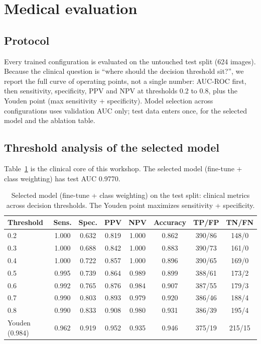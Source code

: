 \documentclass[11pt,a4paper]{article}
\begin{document}
\section{Medical evaluation}

\subsection{Protocol}

Every trained configuration is evaluated on the untouched test split (624 images). Because the clinical question is ``where should the decision threshold sit?'', we report the full curve of operating points, not a single number: AUC-ROC first, then sensitivity, specificity, PPV and NPV at thresholds 0.2 to 0.8, plus the Youden point (max sensitivity + specificity). Model selection across configurations uses validation AUC only; test data enters once, for the selected model and the ablation table.

\subsection{Threshold analysis of the selected model}

Table~\ref{tab:thresholds} is the clinical core of this workshop. The selected model (fine-tune + class weighting) has test AUC 0.9770.

\begin{table}[h]
\centering
\caption{Selected model (fine-tune + class weighting) on the test split: clinical metrics across decision thresholds. The Youden point maximizes sensitivity + specificity.}
\label{tab:thresholds}
\small
\setlength{\tabcolsep}{4.5pt}
\begin{tabular}{lccccccc}
\toprule
Threshold & Sens. & Spec. & PPV & NPV & Accuracy & TP/FP & TN/FN \\
\midrule
0.2 & 1.000 & 0.632 & 0.819 & 1.000 & 0.862 & 390/86 & 148/0 \\
0.3 & 1.000 & 0.688 & 0.842 & 1.000 & 0.883 & 390/73 & 161/0 \\
0.4 & 1.000 & 0.722 & 0.857 & 1.000 & 0.896 & 390/65 & 169/0 \\
0.5 & 0.995 & 0.739 & 0.864 & 0.989 & 0.899 & 388/61 & 173/2 \\
0.6 & 0.992 & 0.765 & 0.876 & 0.984 & 0.907 & 387/55 & 179/3 \\
0.7 & 0.990 & 0.803 & 0.893 & 0.979 & 0.920 & 386/46 & 188/4 \\
0.8 & 0.990 & 0.833 & 0.908 & 0.980 & 0.931 & 386/39 & 195/4 \\
\midrule
Youden (0.984) & 0.962 & 0.919 & 0.952 & 0.935 & 0.946 & 375/19 & 215/15 \\
\bottomrule
\end{tabular}
\end{table}
\end{document}
